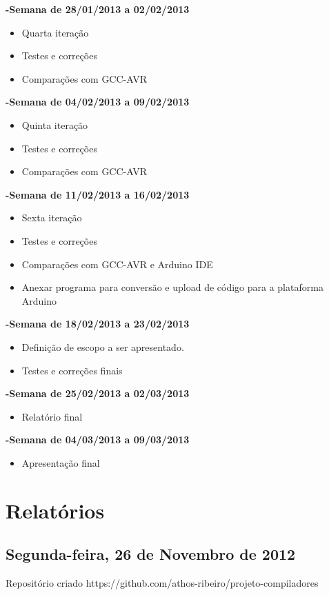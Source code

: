 \documentclass{abnt}
\begin{document}
    \textbf{-Semana de 28/01/2013 a 02/02/2013}
        \begin{itemize}
            \item Quarta iteração
            \item Testes e correções
            \item Comparações com GCC-AVR
        \end{itemize}
    \textbf{-Semana de 04/02/2013 a 09/02/2013}
        \begin{itemize}
            \item Quinta iteração
            \item Testes e correções
            \item Comparações com GCC-AVR
        \end{itemize}
    \textbf{-Semana de 11/02/2013 a 16/02/2013}
        \begin{itemize}
            \item Sexta iteração
            \item Testes e correções
            \item Comparações com GCC-AVR e Arduino IDE
            \item Anexar programa para conversão e upload de código para a plataforma Arduino
        \end{itemize}
    \textbf{-Semana de 18/02/2013 a 23/02/2013}
        \begin{itemize}
            \item Definição de escopo a ser apresentado.
            \item Testes e correções finais
        \end{itemize}
    \textbf{-Semana de 25/02/2013 a 02/03/2013}
        \begin{itemize}
            \item Relatório final
        \end{itemize}
    \textbf{-Semana de 04/03/2013 a 09/03/2013}
        \begin{itemize}
            \item Apresentação final
        \end{itemize}

\chapter{Relatórios}
\section{Segunda-feira, 26 de Novembro de 2012}
Repositório criado
    https://github.com/athos-ribeiro/projeto-compiladores
\end{document}
